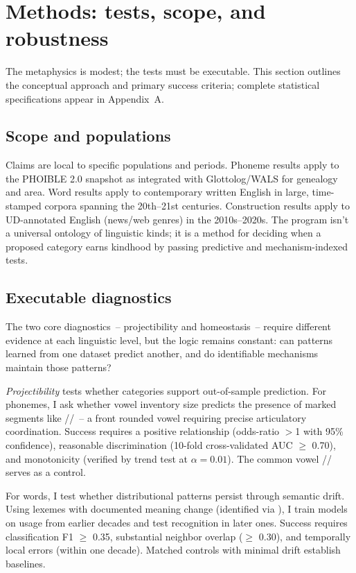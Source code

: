 \documentclass[12pt]{article}
\begin{document}
\section{Methods: tests, scope, and robustness}\label{sec:methods}

The metaphysics is modest; the tests must be executable. This section outlines the conceptual approach and primary success criteria; complete statistical specifications appear in Appendix~A.

\subsection{Scope and populations}

Claims are local to specific populations and periods. Phoneme results apply to the PHOIBLE 2.0 snapshot as integrated with Glottolog/WALS for genealogy and area. Word results apply to contemporary written English in large, time-stamped corpora spanning the 20th--21st centuries. Construction results apply to UD-annotated English (news/web genres) in the 2010s--2020s. The program isn't a universal ontology of linguistic kinds; it is a method for deciding when a proposed category earns kindhood by passing predictive and mechanism-indexed tests.

\subsection{Executable diagnostics}

The two core diagnostics~-- projectibility and homeostasis~-- require different evidence at each linguistic level, but the logic remains constant: can patterns learned from one dataset predict another, and do identifiable mechanisms maintain those patterns?

\textit{Projectibility} tests whether categories support out-of-sample prediction. For phonemes, I ask whether vowel inventory size predicts the presence of marked segments like //~-- a front rounded vowel requiring precise articulatory coordination. Success requires a positive relationship (odds-ratio $>$1 with 95\% confidence), reasonable discrimination (10-fold cross-validated AUC $\geq$ 0.70), and monotonicity (verified by trend test at $\alpha = 0.01$). The common vowel // serves as a control.

For words, I test whether distributional patterns persist through semantic drift. Using lexemes with documented meaning change (identified via \citet{HamiltonEtAl2016}), I train models on usage from earlier decades and test recognition in later ones. Success requires classification F1 $\geq$ 0.35, substantial neighbor overlap ($\geq$ 0.30), and temporally local errors (within one decade). Matched controls with minimal drift establish baselines.
\end{document}
